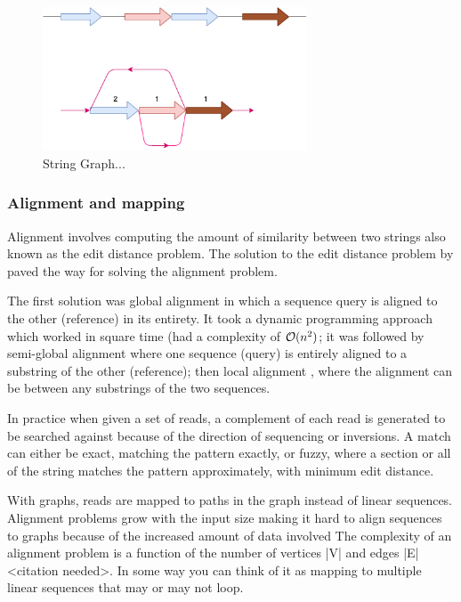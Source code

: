 \documentclass[11pt]{article}
\begin{document}
\begin{enumerate}
\begin{figure}[H]
\centering
\includegraphics[width=0.7\textwidth]{figures/String Graph.png}
\caption{String Graph...}
\end{figure}\label{string graph}
\end{enumerate}

\subsubsection{Alignment and mapping}
\label{sec:org8dd7e02}
Alignment involves computing the amount of similarity between two strings also 
known as the edit distance problem.
The solution to the edit distance problem by
\cite{levenshteinBinaryCodesCapable1966a} paved the way for solving the alignment
problem.

The first solution was global alignment
\cite{needlemanGeneralMethodApplicable1970} in which a sequence query is aligned
to the other (reference) in its entirety. It took a dynamic programming approach
which worked in square time (had a complexity of \(\mathcal{O}(n^2)\); it was followed
by semi-global alignment \cite{sellersTheoryComputationEvolutionary1980}
where one sequence (query) is entirely
aligned to a substring of the other (reference); then local alignment
\cite{smithIdentificationCommonMolecular1981}, where the alignment can be between 
any substrings of the two sequences.

In practice when given a set of reads, a complement of each read is generated to 
be searched against because of the direction of sequencing or inversions.
A match can either be exact, matching the pattern exactly, or fuzzy, where a 
section or all of the string matches the pattern approximately, with minimum 
edit distance.

With graphs, reads are mapped to paths in the graph instead of linear sequences.
Alignment problems grow with the input size
\cite{durbinEfficientHaplotypeMatching2014} making it hard to align sequences to
graphs  because of the increased amount of data involved
The complexity of an alignment problem is a function of the
number of  vertices |V| and edges |E| <citation needed>.  In some way you can
think of it as mapping to multiple linear sequences that may or may not loop.
\end{document}
